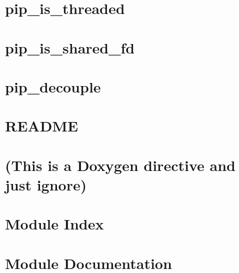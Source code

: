 \documentclass[twoside]{book}
\begin{document}
\chapter{pip\-\_\-is\-\_\-threaded}
\label{pip_is_threaded}
\hypertarget{pip_is_threaded}{}

\chapter{pip\-\_\-is\-\_\-shared\-\_\-fd}
\label{pip_is_shared_fd}
\hypertarget{pip_is_shared_fd}{}

\chapter{pip\-\_\-decouple}
\label{pip_decouple}
\hypertarget{pip_decouple}{}

\chapter{R\-E\-A\-D\-M\-E}
\label{md_README}
\hypertarget{md_README}{}

\chapter{(This is a Doxygen directive and just ignore)}
\label{libpip}
\hypertarget{libpip}{}

\chapter{Module Index}

\chapter{Module Documentation}











\newpage
{}
{}
\printindex
\end{document}
